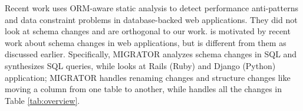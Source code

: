Recent work uses
ORM-aware static analysis to detect performance anti-patterns \cite{yang2018powerstation, chen2016finding0} and data constraint problems \cite{yang2020managing} in database-backed web applications. They did not look at
schema changes and are orthogonal to our work. 
\Tool is motivated by recent work \cite{wang2017verifying, wang2019synthesizing} about schema changes in web applications, but is different from
them as discussed earlier. Specifically, MIGRATOR
\cite{wang2019synthesizing} analyzes schema changes in SQL and synthesizes SQL queries,
while \Tool looks at Rails (Ruby) and Django (Python) application; MIGRATOR handles
renaming changes and structure changes like moving a column from one table to another,
while \Tool handles all the changes in Table \ref{tab:overview}.